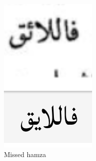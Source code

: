 \begin{figure}[h]
	\begin{subfigure}[b]{0.3\linewidth}
	\centering
	\includegraphics[width=\textwidth]{images/image28.png}
	\caption{Missed hamza}
	\label{fig:fig18}
	\end{subfigure}
	\begin{subfigure}[b]{0.3\linewidth}
	\centering

\end{subfigure}
\end{figure}
